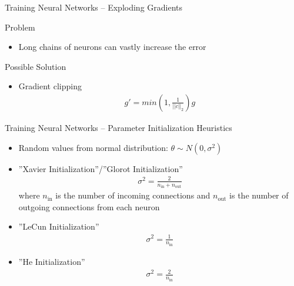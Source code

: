 \documentclass[ignorenonframetext,xcolor=x11names]{beamer}
\begin{document}
\begin{frame}{Training Neural Networks -- Exploding Gradients }
\begin{block}{Problem}
\begin{itemize}
   \item Long chains of neurons can vastly increase the error
\end{itemize}
\end{block}
\begin{block}{Possible Solution}
\begin{itemize}
   \item Gradient clipping
\begin{align*}
g' = min(1, \frac{1}{||c||_2}) g
\end{align*}
\end{itemize}
\end{block}
\end{frame}

\begin{frame}{Training Neural Networks -- Parameter Initialization Heuristics}
\begin{itemize}
  \item Random values from normal distribution: $\theta \sim N(0, \sigma^2)$
  \item ''Xavier Initialization''/''Glorot Initialization''
\begin{align*}
  \sigma^2 = \frac{2}{n_{\text{in}} + n_{\text{out}}}
\end{align*}
   where $n_{\text{in}}$ is the number of incoming connections and $n_{\text{out}}$ is the number of outgoing connections from each neuron
   \item ''LeCun Initialization''
\begin{align*}
  \sigma^2 = \frac{1}{n_{\text{in}}}
\end{align*}
   \item ''He Initialization''
\begin{align*}
  \sigma^2 = \frac{2}{n_{\text{in}}}
\end{align*}
\end{itemize}
\end{frame}
\end{document}
